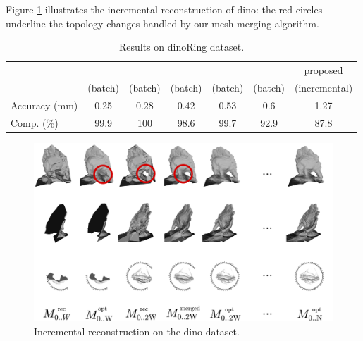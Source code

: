Figure \ref{fig:dinoIncr} illustrates the incremental reconstruction of dino: the red circles underline the topology changes handled by our mesh merging algorithm.

\begin{table}[t]
\normalsize
\centering
\setlength{\tabcolsep}{1px}
  \caption{Results on dinoRing dataset.}
  \label{tab:dinoRes}
    \begin{tabular}{lcccccc}
    \hline
    &
    \cite{savinov2016semantic}&
    \cite{li2015detail}&
    \cite{zaharescu2007transformesh}&
    \cite{hiep2009towards}&%
    \cite{gargallo2007minimizing}&proposed\\
    &(batch)&(batch)&(batch)&(batch)&(batch)&%
    (incremental)\\
    \hline
    Accuracy (mm) &0.25&0.28&0.42&0.53&%
    0.6&1.27\\
    Comp. (\%)&99.9&100&98.6&99.7&%
    92.9&87.8
    \end{tabular}
\end{table}



\begin{figure}
  \centering
  \includegraphics[width=\textwidth]{./img/ch-incr-dens/dino}
  \caption{Incremental reconstruction on the dino dataset.}
  \label{fig:dinoIncr}
\end{figure}


